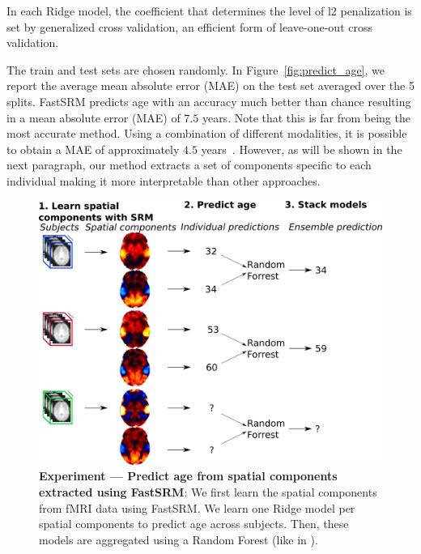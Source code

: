 In each Ridge model, the coefficient that determines the level of l2 penalization is set by generalized cross validation, an efficient form of leave-one-out cross validation.

The train and test sets are chosen randomly. In Figure~\ref{fig:predict_age}, we report the average mean absolute error (MAE) on the test set averaged over the 5 splits.
FastSRM predicts age with an accuracy much better than chance resulting in a
mean absolute error (MAE) of $7.5$ years. Note that this is far from being the
most accurate method. Using a combination of different modalities, it is
possible to obtain a MAE of approximately $4.5$
years~\cite{engemann2019combining}. However, as will be shown in the next
paragraph, our method extracts a set of
components specific to each individual making it more interpretable than other approaches.

\begin{figure}
\centering
\includegraphics[scale=0.35]{figures/srm/conceptual_figure72.png}
\caption{\textbf{Experiment — Predict age from spatial components extracted using FastSRM}: We first learn the spatial components from fMRI data using FastSRM. We learn one Ridge model per spatial components to predict age across subjects. Then, these models are aggregated using a Random Forest (like in \cite{rahim2017joint}).} 
\label{fig:experiment_age_prediction}
\end{figure}


